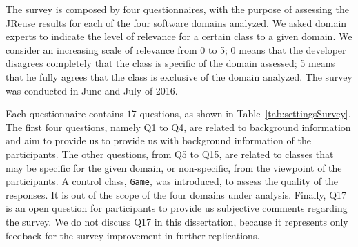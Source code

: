 The survey is composed by four questionnaires, with the purpose of assessing the JReuse results for each of the four software domains analyzed. We asked domain experts to indicate the level of relevance for a certain class to  a given domain. We consider an increasing scale of relevance from 0 to 5; 0 means that the developer disagrees completely that the class is specific of the domain assessed; 5 means that he fully agrees that the class is exclusive of the domain analyzed. The survey was conducted in June and July of 2016.

Each questionnaire contains $17$ questions, as shown in Table~\ref{tab:settingsSurvey}. The first four questions, namely Q1 to Q4, are related to background information and aim to provide us to provide  us with background information of the participants. The other questions, from Q5 to Q15, are related to classes that may be specific for the given domain, or non-specific, from the viewpoint of the participants. A control class, \texttt{Game}, was introduced, to assess the quality of the responses. It is out of the scope of the four domains under analysis. Finally, Q17 is an open question for participants to provide us subjective comments regarding the survey. We do not discuss Q17 in this dissertation, because it represents only feedback for the survey improvement in further replications.




